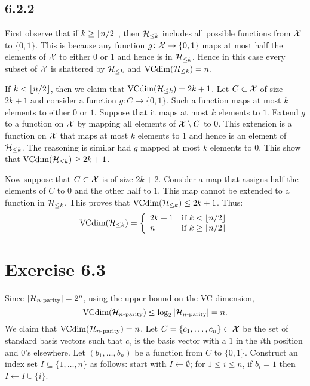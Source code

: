 \subsection*{6.2.2}

First observe that if $k \geq \left \lfloor n / 2 \right \rfloor$, then $\mathcal{H}_{\leq k}$ includes 
all possible functions from $\mathcal{X}$ to $\{0, 1\}$. This is because any function 
$g \colon \mathcal{X} \rightarrow \{0, 1\}$ maps at most half the elements of 
$\mathcal{X}$ to either $0$ or $1$ and hence is in $\mathcal{H}_{\leq k}$. 
Hence in this case every subset of $\mathcal{X}$ is shattered by $\mathcal{H}_{\leq k}$
and $\text{VCdim} (\mathcal{H}_{\leq k}) = n$.

If $k < \left \lfloor n / 2 \right \rfloor$, then we claim that  $\text{VCdim} (\mathcal{H}_{\leq k}) = 2k + 1$.
Let $C \subset \mathcal{X}$ of size $2k + 1$ and consider a function 
$g \colon C \rightarrow \{0, 1\}$. Such a function maps at most $k$ elements 
to either $0$ or $1$. Suppose that it maps at most $k$ elements to $1$. Extend
$g$ to a function on $\mathcal{X}$ by mapping all elements of $\mathcal{X} \setminus C$ to $0$. 
This extension is a function on $\mathcal{X}$ that maps at most $k$ elements to $1$
and hence is an element of $\mathcal{H}_{\leq k}$. The reasoning is similar had $g$ 
mapped at most $k$ elements to $0$. This show that 
$\text{VCdim}(\mathcal{H}_{\leq k}) \geq 2k + 1$. 

Now suppose that $C \subset \mathcal{X}$ is of size $2k + 2$. Consider a map  
that assigns half the elements of $C$ to $0$ and the other half to $1$. 
This map cannot be extended to a function in $\mathcal{H}_{\leq k}$. This 
proves that $\text{VCdim} (\mathcal{H}_{\leq k}) \leq 2k + 1$. Thus:
\[\text{VCdim}(\mathcal{H}_{\leq k}) 
= \left \{ \begin{array}{ll} 
                2k + 1  & \text{if } k < \left \lfloor n / 2 \right \rfloor \\
                n       & \text{if } k \geq \left \lfloor n / 2 \right \rfloor 
           \end{array} \right .
\]

\section*{Exercise 6.3}

Since $|\mathcal{H}_{n\text{-parity}}| = 2^n$, using the upper bound on the VC-dimension, 
\[\text{VCdim} (\mathcal{H}_{n\text{-parity}}) \leq \log_2 |\mathcal{H}_{n\text{-parity}}| = n.\]
We claim that $\text{VCdim} (\mathcal{H}_{n\text{-parity}}) = n$. Let $C = \{c_1, \ldots, c_n\} \subset
\mathcal{X}$ be the set of standard basis vectors such that $c_i$ is the basis 
vector with a $1$ in the $i$th position and $0$'s
elsewhere. Let $(b_1, \ldots, b_n)$ be a function from $C$ to $\{0, 1\}$.
Construct an index set $I \subseteq \{1, \ldots, n\}$ as follows: 
start with $I \leftarrow \emptyset$; for $1 \leq i \leq n$, if $b_i = 1$ 
then $I \leftarrow I \cup \{i\}$. 

